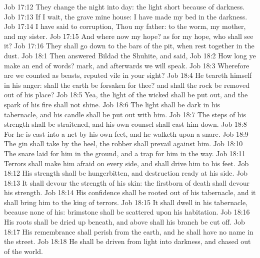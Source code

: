 \vs Job 17:12 They change the night into day: the light  short because of darkness.
\vs Job 17:13 If I wait, the grave  mine house: I have made my bed in the darkness.
\vs Job 17:14 I have said to corruption, Thou  my father: to the worm,  my mother, and my sister.
\vs Job 17:15 And where  now my hope? as for my hope, who shall see it?
\vs Job 17:16 They shall go down to the bars of the pit, when  rest together  in the dust.
\vs Job 18:1 Then answered Bildad the Shuhite, and said,
\vs Job 18:2 How long  ye make an end of words? mark, and afterwards we will speak.
\vs Job 18:3 Wherefore are we counted as beasts,  reputed vile in your sight?
\vs Job 18:4 He teareth himself in his anger: shall the earth be forsaken for thee? and shall the rock be removed out of his place?
\vs Job 18:5 Yea, the light of the wicked shall be put out, and the spark of his fire shall not shine.
\vs Job 18:6 The light shall be dark in his tabernacle, and his candle shall be put out with him.
\vs Job 18:7 The steps of his strength shall be straitened, and his own counsel shall cast him down.
\vs Job 18:8 For he is cast into a net by his own feet, and he walketh upon a snare.
\vs Job 18:9 The gin shall take  by the heel,  the robber shall prevail against him.
\vs Job 18:10 The snare  laid for him in the ground, and a trap for him in the way.
\vs Job 18:11 Terrors shall make him afraid on every side, and shall drive him to his feet.
\vs Job 18:12 His strength shall be hungerbitten, and destruction  ready at his side.
\vs Job 18:13 It shall devour the strength of his skin:  the firstborn of death shall devour his strength.
\vs Job 18:14 His confidence shall be rooted out of his tabernacle, and it shall bring him to the king of terrors.
\vs Job 18:15 It shall dwell in his tabernacle, because  none of his: brimstone shall be scattered upon his habitation.
\vs Job 18:16 His roots shall be dried up beneath, and above shall his branch be cut off.
\vs Job 18:17 His remembrance shall perish from the earth, and he shall have no name in the street.
\vs Job 18:18 He shall be driven from light into darkness, and chased out of the world.
